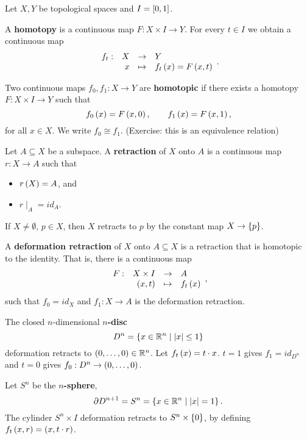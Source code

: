 Let $ X, Y $ be topological spaces and $ I = \sb{0, 1} $.

\begin{definition*}
A \textbf{homotopy} is a continuous map $ F : X \times I \to Y $. For every $ t \in I $ we obtain a continuous map
$$ \function[f_t]{X}{Y}{x}{f_t\rb{x} = F\rb{x, t}}. $$
\end{definition*}

\begin{definition*}
Two continuous maps $ f_0, f_1 : X \to Y $ are \textbf{homotopic} if there exists a homotopy $ F : X \times I \to Y $ such that
$$ f_0\rb{x} = F\rb{x, 0}, \qquad f_1\rb{x} = F\rb{x, 1}, $$
for all $ x \in X $. We write $ f_0 \cong f_1 $. (Exercise: this is an equivalence relation)
\end{definition*}

\begin{definition*}
Let $ A \subseteq X $ be a subspace. A \textbf{retraction} of $ X $ onto $ A $ is a continuous map $ r : X \to A $ such that
\begin{itemize}
\item $ r\rb{X} = A $, and
\item $ r\mid_A = id_A $.
\end{itemize}
\end{definition*}

\begin{example*}
If $ X \ne \emptyset $, $ p \in X $, then $ X $ retracts to $ p $ by the constant map $ X \to \cb{p} $.
\end{example*}

\begin{definition*}
A \textbf{deformation retraction} of $ X $ onto $ A \subseteq X $ is a retraction that is homotopic to the identity. That is, there is a continuous map
$$ \function[F]{X \times I}{A}{\rb{x, t}}{f_t\rb{x}}, $$
such that $ f_0 = id_X $ and $ f_1 : X \to A $ is the deformation retraction.
\end{definition*}

\begin{example*}
The closed $ n $-dimensional \textbf{$ n $-disc}
$$ D^n = \cb{x \in \R^n \mid \abs{x} \le 1} $$
deformation retracts to $ \rb{0, \dots, 0} \in \R^n $. Let $ f_t\rb{x} = t \cdot x $. $ t = 1 $ gives $ f_1 = id_{D^n} $ and $ t = 0 $ gives $ f_0 : D^n \to \rb{0, \dots, 0} $.
\end{example*}

\begin{example*}
Let $ S^n $ be the \textbf{$ n $-sphere},
$$ \partial D^{n + 1} = S^n = \cb{x \in \R^n \mid \abs{x} = 1}. $$
The cylinder $ S^n \times I $ deformation retracts to $ S^n \times \cb{0} $, by defining $ f_t\rb{x, r} = \rb{x, t \cdot r} $.
\end{example*}

